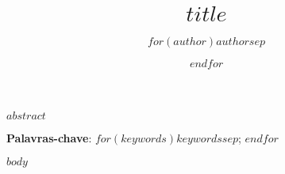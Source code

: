 \documentclass[12pt]{abntex2}
\title{$title$}
\author{$for(author)$$author$$sep$ \and $endfor$}
\begin{document}
\imprimircapa
\imprimirfolhaderosto

\begin{resumo}
$abstract$

\textbf{Palavras-chave}: $for(keywords)$$keywords$$sep$; $endfor$
\end{resumo}

\tableofcontents
\listoffigures
\listoftables
\newpage
$body$
\end{document}
